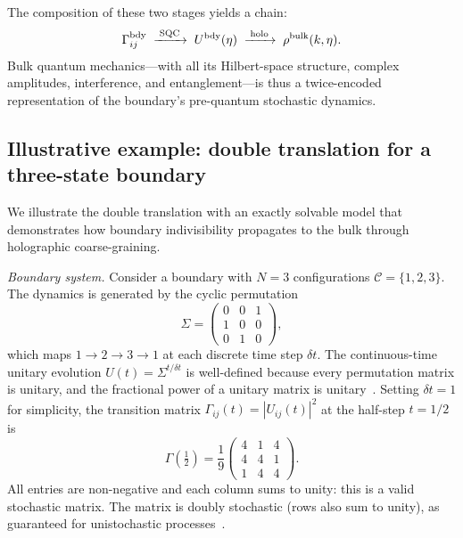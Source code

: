 \documentclass[aps,prd,twocolumn,superscriptaddress,nofootinbib]{revtex4-2}
\begin{document}
The composition of these two stages yields a chain:
\begin{equation}
\Gamma^{\rm bdy}_{ij} \;\xrightarrow{\;\text{SQC}\;}\; U^{\rm bdy}(\eta) \;\xrightarrow{\;\text{holo}\;}\; \rho^{\rm bulk}(k,\eta).
\label{eq:chain}
\end{equation}
Bulk quantum mechanics---with all its Hilbert-space structure, complex amplitudes, interference, and entanglement---is thus a twice-encoded representation of the boundary's pre-quantum stochastic dynamics.

\subsection{Illustrative example: double translation for a three-state boundary}
\label{sec:toymodel}

We illustrate the double translation with an exactly solvable model that demonstrates how boundary indivisibility propagates to the bulk through holographic coarse-graining.

\emph{Boundary system.} Consider a boundary with $N = 3$ configurations $\mathcal{C} = \{1, 2, 3\}$. The dynamics is generated by the cyclic permutation
\begin{equation}
\Sigma = \begin{pmatrix} 0 & 0 & 1 \\ 1 & 0 & 0 \\ 0 & 1 & 0 \end{pmatrix},
\label{eq:Sigma}
\end{equation}
which maps $1 \to 2 \to 3 \to 1$ at each discrete time step $\delta t$. The continuous-time unitary evolution $U(t) = \Sigma^{t/\delta t}$ is well-defined because every permutation matrix is unitary, and the fractional power of a unitary matrix is unitary~\cite{Barandes2025SQT}. Setting $\delta t = 1$ for simplicity, the transition matrix $\Gamma_{ij}(t) = |U_{ij}(t)|^2$ at the half-step $t = 1/2$ is
\begin{equation}
\Gamma\!\left(\tfrac{1}{2}\right) = \frac{1}{9}\begin{pmatrix} 4 & 1 & 4 \\ 4 & 4 & 1 \\ 1 & 4 & 4 \end{pmatrix}.
\label{eq:Gamma_half}
\end{equation}
All entries are non-negative and each column sums to unity: this is a valid stochastic matrix. The matrix is doubly stochastic (rows also sum to unity), as guaranteed for unistochastic processes~\cite{Barandes2025SQC}.
\end{document}
